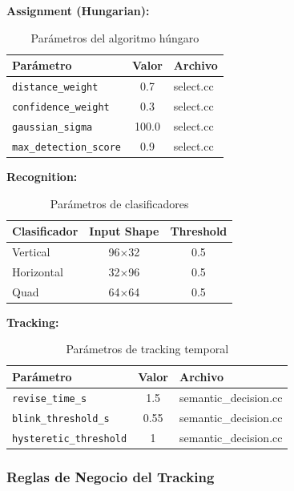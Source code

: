 \textbf{Assignment (Hungarian):}

\begin{table}[H]
\centering
\begin{tabular}{|l|c|l|}
\hline
\textbf{Parámetro} & \textbf{Valor} & \textbf{Archivo} \\
\hline
\texttt{distance\_weight} & 0.7 & select.cc \\
\texttt{confidence\_weight} & 0.3 & select.cc \\
\texttt{gaussian\_sigma} & 100.0 & select.cc \\
\texttt{max\_detection\_score} & 0.9 & select.cc \\
\hline
\end{tabular}
\caption{Parámetros del algoritmo húngaro}
\end{table}

\textbf{Recognition:}

\begin{table}[H]
\centering
\begin{tabular}{|l|c|c|}
\hline
\textbf{Clasificador} & \textbf{Input Shape} & \textbf{Threshold} \\
\hline
Vertical & 96×32 & 0.5 \\
Horizontal & 32×96 & 0.5 \\
Quad & 64×64 & 0.5 \\
\hline
\end{tabular}
\caption{Parámetros de clasificadores}
\end{table}

\textbf{Tracking:}

\begin{table}[H]
\centering
\begin{tabular}{|l|c|l|}
\hline
\textbf{Parámetro} & \textbf{Valor} & \textbf{Archivo} \\
\hline
\texttt{revise\_time\_s} & 1.5 & semantic\_decision.cc \\
\texttt{blink\_threshold\_s} & 0.55 & semantic\_decision.cc \\
\texttt{hysteretic\_threshold} & 1 & semantic\_decision.cc \\
\hline
\end{tabular}
\caption{Parámetros de tracking temporal}
\end{table}

\subsubsection{Reglas de Negocio del Tracking}

